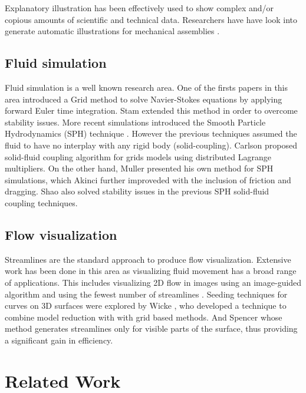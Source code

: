 \documentclass[11pt]{report}
\begin{document}
Explanatory illustration has been effectively used to show complex and/or copious amounts of  scientific and technical data.
Researchers have have look into generate automatic illustrations for mechanical assemblies \cite{Mitra2010}.


\subsection{Fluid simulation}

Fluid simulation is a well known research area. 
One of the firsts papers in this area introduced a Grid method \cite{Foster1996} to solve Navier-Stokes equations by applying forward Euler time integration. 
Stam \cite{Stam1999} extended this method in order to overcome stability issues.
More recent simulations introduced the Smooth Particle Hydrodynamics (SPH) technique \cite{DesbrunMathieuandGascuel1996}.
However the previous techniques assumed the fluid to have no interplay with any rigid body (solid-coupling).
Carlson \cite{Carlson2004} proposed solid-fluid coupling algorithm for grids models using distributed Lagrange multipliers.
On the other hand, Muller \cite{Muller2004} presented his own method for SPH simulations, which Akinci \cite{Akinci2012} further improveded with the inclusion of friction and dragging. 
Shao \cite{Shao2014} also solved stability issues in the previous SPH solid-fluid coupling techniques.

\subsection{Flow visualization}

Streamlines are the standard approach to produce flow visualization.
Extensive work has been done in this area as visualizing fluid movement has a broad range of applications.
This includes visualizing 2D flow in images using an image-guided algorithm \cite{Turk1996} and using the fewest number of streamlines \cite{Li2008}.
Seeding techniques for curves on 3D surfaces were explored by Wicke \cite{Wicke2009}, who developed a technique to combine model reduction with with grid based methods.
And Spencer \cite{Spencer2009} whose method generates streamlines only for visible parts of the surface, thus providing a significant gain in efficiency.

\section{Related Work}
\end{document}
